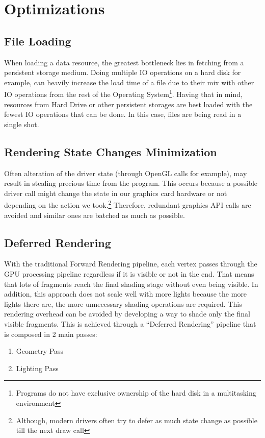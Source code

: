 \section{Optimizations}

\subsection{File Loading}
When loading a data resource, the greatest bottleneck lies in fetching from a persistent storage medium.
Doing multiple IO operations on a hard disk for example, can heavily increase the load time of a file
due to their mix with other IO operations from the rest of the Operating System\footnote{Programs do
not have exclusive ownership of the hard disk in a multitasking environment}. Having that in mind, resources
from Hard Drive or other persistent storages are best loaded with the fewest IO operations that can be done.
In this case, files are being read in a single shot.

\subsection{Rendering State Changes Minimization}
Often alteration of the driver state (through OpenGL calls for example), may result in stealing precious time
from the program. This occurs because a possible driver call might change the state in our graphics card hardware
or not depending on the action we took.\footnote{Although, modern drivers often try to defer as much state change as
possible till the next draw call} Therefore, redundant graphics API calls are avoided and similar ones are batched
as much as possible.

\subsection{Deferred Rendering}
With the traditional Forward Rendering pipeline, each vertex passes through the GPU processing pipeline regardless
if it is visible or not in the end. That means that lots of fragments reach the final shading stage without even
being visible. In addition, this approach does not scale well with more lights because the more lights there are,
the more unnecessary shading operations are required. This rendering overhead can be avoided by developing a way
to shade only the final visible fragments. This is achieved through a ``Deferred Rendering'' pipeline that is
composed in 2 main passes:

\begin{enumerate}
\item Geometry Pass
\item Lighting Pass
\end{enumerate}

